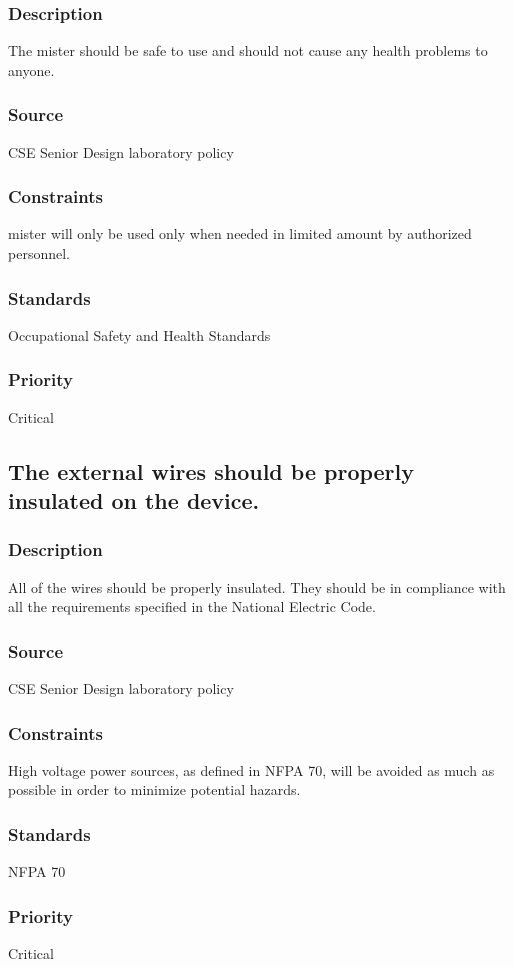 \subsubsection{Description}
The mister should be safe to use and should not cause any health problems to anyone.
\subsubsection{Source}
CSE Senior Design laboratory policy
\subsubsection{Constraints}
mister will only be used only when needed in limited amount by authorized personnel.
\subsubsection{Standards}
Occupational Safety and Health Standards
\subsubsection{Priority}
Critical

\subsection{The external wires should be properly insulated on the device.}
\subsubsection{Description}
All of the wires should be properly insulated. They should be in compliance with all the requirements specified in the National Electric Code.
\subsubsection{Source}
CSE Senior Design laboratory policy
\subsubsection{Constraints}
High voltage power sources, as defined in NFPA 70, will be avoided as much as possible in order to minimize potential hazards.
\subsubsection{Standards}
NFPA 70
\subsubsection{Priority}
Critical

